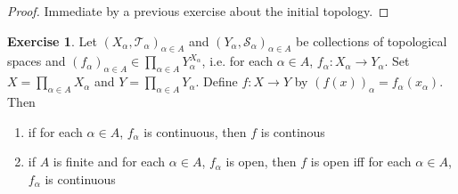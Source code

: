 \documentclass[12pt]{amsart}
\theoremstyle{definition}
\newtheorem{ex}[definition]{Exercise}
\newcommand{\al}{\alpha}
\newcommand{\MS}{\mathcal{S}}
\newcommand{\MT}{\mathcal{T}}
\DeclareMathOperator*{\0}{\mbf{0}}
\DeclareMathOperator*{\1}{\mbf{1}}
\begin{document}
	\begin{proof}
		Immediate by a previous exercise about the initial topology.
	\end{proof}
	
	\begin{ex}
		Let $(X_{\al}, \MT_{\al})_{\al \in A}$ and $(Y_{\al}, \MS_{\al})_{\al \in A}$ be collections of topological spaces and $(f_{\al})_{\al \in A} \in \prod\limits_{\al \in A} Y_{\al}^{X_{\al}}$, i.e. for each $\al \in A$, $f_{\al}:X_{\al} \rightarrow Y_{\al}$. Set $X = \prod\limits_{\al \in A} X_{\al}$ and $Y = \prod\limits_{\al \in A}Y_{\al}$. Define $f: X \rightarrow Y$ by $(f(x))_{\al} = f_{\al}(x_{\al})$. Then 
		\begin{enumerate}
			\item if for each $\al \in A$, $f_{\al}$ is continuous, then $f$ is continous
			\item if $A$ is finite and for each $\al \in A$, $f_{\al}$ is open, then $f$ is open iff for each $\al \in A$, $f_{\al}$ is continuous
		\end{enumerate}
	\end{ex}
\end{document}
